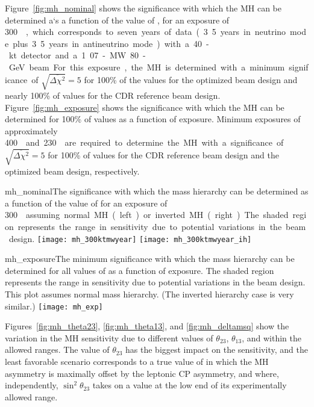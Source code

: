 Figure~\ref{fig:mh_nominal} shows the significance with which the MH
can be determined a`s a function of the value of \deltacp, for an
exposure of \SI{300}~\ktMWyr, which corresponds to seven years of data
(3.5 years in neutrino mode plus 3.5 years in antineutrino mode) with
a 40-kt detector and a 1.07-MW 80-GeV beam.  For this exposure, the MH is
determined with a minimum significance of
$\sqrt{\overline{\Delta\chi^{2}}} = 5$ for 100\% of the \deltacp
values for the optimized beam design and nearly 100\% of \deltacp
values for the CDR reference beam design.
Figure~\ref{fig:mh_exposure} shows the significance with which the MH
can be determined for 100\% of \deltacp values as a function of
exposure.  Minimum exposures of approximately \SI{400}~\ktMWyr{} and
\SI{230}~\ktMWyr{} are required to determine the MH with a significance of
$\sqrt{\overline{\Delta\chi^2}} = 5$ for 100\% of \deltacp values for
the CDR reference beam design and the optimized beam design,
respectively.

\begin{cdrfigure}{mh_nominal}{The significance with which the mass hierarchy can be determined as a function of the value of \deltacp for an exposure of \SI{300}~\ktMWyr{} assuming normal MH (left) or inverted MH (right).  The shaded region represents the range in sensitivity due to potential variations in the beam design.}
 \texttt{[image: mh\_300ktmwyear]}
 \texttt{[image: mh\_300ktmwyear\_ih]}
\end{cdrfigure}

\begin{cdrfigure}{mh_exposure}{The minimum significance with which the mass hierarchy can be determined for all values of \deltacp as a function of exposure.  The shaded region represents the range in sensitivity due to potential variations in the beam design. This plot assumes normal mass hierarchy. (The inverted hierarchy case is very similar.)}
 \texttt{[image: mh\_exp]}
\end{cdrfigure}

Figures~\ref{fig:mh_theta23}, \ref{fig:mh_theta13}, and
\ref{fig:mh_deltamsq} show the variation in the MH sensitivity due to
different values of $\theta_{23}$, $\theta_{13}$, and  within
the allowed ranges.  The value of $\theta_{23}$ has the biggest impact
on the sensitivity, and the least favorable scenario corresponds to a
true value of \deltacp in which the MH asymmetry is maximally offset
by the leptonic CP asymmetry, and where, independently,
$\sin^2{\theta_{23}}$ takes on a value at the low end of its
experimentally allowed range.

